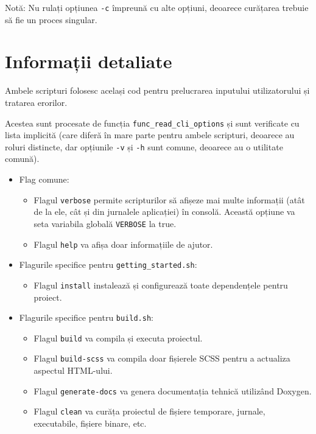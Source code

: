 Notă: Nu rulați opțiunea \texttt{-c} împreună cu alte opțiuni, deoarece curățarea trebuie să fie un proces singular.

\chapter{Informații detaliate}
Ambele scripturi folosesc același cod pentru prelucrarea inputului utilizatorului și tratarea erorilor.

Acestea sunt procesate de funcția \texttt{func\_read\_cli\_options} și sunt verificate cu lista implicită (care diferă în mare parte pentru ambele scripturi, deoarece au roluri distincte, dar opțiunile \texttt{-v} și \texttt{-h} sunt comune, deoarece au o utilitate comună).

\begin{itemize}
  \item Flag comune:
    \begin{itemize}
      \item Flagul \texttt{verbose} permite scripturilor să afișeze mai multe informații (atât de la ele, cât și din jurnalele aplicației) în consolă. Această opțiune va seta variabila globală \texttt{VERBOSE} la true.
      \item Flagul \texttt{help} va afișa doar informațiile de ajutor.
    \end{itemize}
  \item Flagurile specifice pentru \texttt{getting\_started.sh}:
    \begin{itemize}
      \item Flagul \texttt{install} instalează și configurează toate dependențele pentru proiect.
    \end{itemize}
  \item Flagurile specifice pentru \texttt{build.sh}:
    \begin{itemize}
      \item Flagul \texttt{build} va compila și executa proiectul.
      \item Flagul \texttt{build-scss} va compila doar fișierele SCSS pentru a actualiza aspectul HTML-ului.
      \item Flagul \texttt{generate-docs} va genera documentația tehnică utilizând Doxygen.
      \item Flagul \texttt{clean} va curăța proiectul de fișiere temporare, jurnale, executabile, fișiere binare, etc.
    \end{itemize}
\end{itemize}

